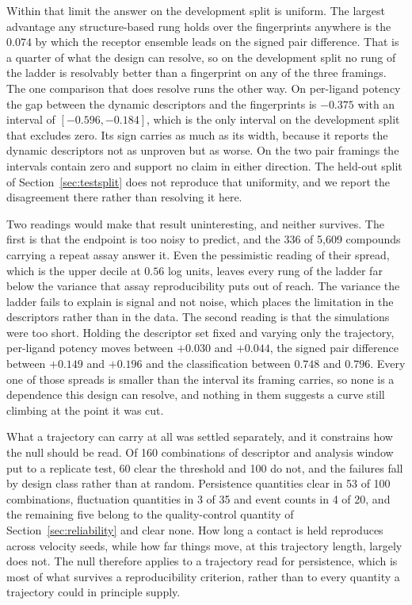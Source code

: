 Within that limit the answer on the development split is uniform. The largest advantage
any structure-based rung holds over the fingerprints anywhere is the $0.074$ by which
the receptor ensemble leads on the signed pair difference. That is a quarter of what
the design can resolve, so on the development split no rung of the ladder is resolvably
better than a fingerprint on any of the three framings. The one comparison that does
resolve runs the other way. On per-ligand potency the gap between the dynamic
descriptors and the fingerprints is $-0.375$ with an interval of $[-0.596, -0.184]$,
which is the only interval on the development split that excludes zero. Its sign
carries as much as its width, because it reports the dynamic descriptors not as
unproven but as worse. On the two pair framings the intervals contain zero and support
no claim in either direction. The held-out split of Section~\ref{sec:testsplit} does
not reproduce that uniformity, and we report the disagreement there rather than
resolving it here.

Two readings would make that result uninteresting, and neither survives. The first is
that the endpoint is too noisy to predict, and the 336 of 5{,}609 compounds carrying a
repeat assay answer it. Even the pessimistic reading of their spread, which is the
upper decile at $0.56$ log units, leaves every rung of the ladder far below the
variance that assay reproducibility puts out of reach. The variance the ladder fails to
explain is signal and not noise, which places the limitation in the descriptors rather
than in the data. The second reading is that the simulations were too short. Holding
the descriptor set fixed and varying only the trajectory, per-ligand potency moves
between $+0.030$ and $+0.044$, the signed pair difference between $+0.149$ and $+0.196$
and the classification between $0.748$ and $0.796$. Every one of those spreads is
smaller than the interval its framing carries, so none is a dependence this design can
resolve, and nothing in them suggests a curve still climbing at the point it was cut.

What a trajectory can carry at all was settled separately, and it constrains how the
null should be read. Of 160 combinations of descriptor and analysis window put to a
replicate test, 60 clear the threshold and 100 do not, and the failures fall by design
class rather than at random. Persistence quantities clear in 53 of 100 combinations,
fluctuation quantities in 3 of 35 and event counts in 4 of 20, and the remaining five
belong to the quality-control quantity of Section~\ref{sec:reliability} and clear
none. How long a contact is
held reproduces across velocity seeds, while how far things move, at this trajectory
length, largely does not. The null therefore applies to a trajectory read for
persistence, which is most of what survives a reproducibility criterion, rather than to
every quantity a trajectory could in principle supply.

